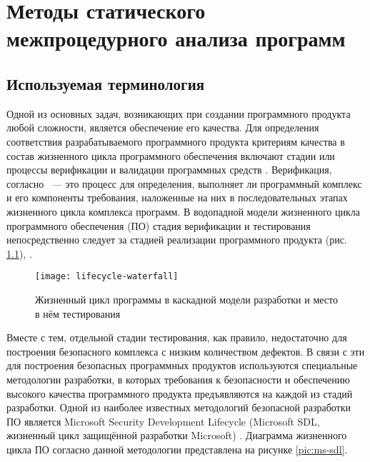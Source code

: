 \chapter{Методы статического межпроцедурного анализа программ} \label{chapt1}


\section{Используемая терминология}

Одной из основных задач, возникающих при создании программного продукта любой сложности, является обеспечение его качества. Для определения соответствия разрабатываемого программного продукта критериям качества в состав жизненного цикла программного обеспечения включают стадии или процессы верификации и валидации программных средств \cite{gost-12207, gost-34.601}. Верификация, согласно \cite{lipaev-zakaz}~--- это процесс для определения, выполняет ли программный комплекс и его компоненты требования, наложенные на них в последовательных этапах жизненного цикла комплекса программ. В водопадной модели жизненного цикла программного обеспечения (ПО) стадия верификации и тестирования непосредственно следует за стадией реализации программного продукта \cite{??} (рис. \ref{pic:lifecycle-waterfall}), . 

\begin{figure}[h]
   \centering
   \texttt{[image: lifecycle-waterfall]}
   \caption{Жизненный цикл программы в каскадной модели разработки и место в нём тестирования}\label{pic:lifecycle-waterfall}
\end{figure}


Вместе с тем, отдельной стадии тестирования, как правило, недостаточно для построения безопасного комплекса с низким количеством дефектов. В связи с эти для построения безопасных программных продуктов используются специальные методологии разработки, в которых требования к безопасности и обеспечению высокого качества программного продукта предъявляются на каждой из стадий разработки. Одной из наиболее известных методологий безопасной разработки ПО является Microsoft Security Development Lifecycle (Microsoft SDL, жизненный цикл защищённой разработки Microsoft) \cite{ms-sdl}. Диаграмма жизненного цикла ПО согласно данной методологии представлена на рисунке \ref{pic:ms-sdl}. 

